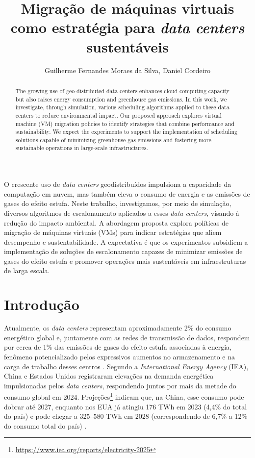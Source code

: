 \documentclass[12pt]{article}
\title{Migração de máquinas virtuais como estratégia para \textit{data centers} sustentáveis}
\author{Guilherme Fernandes Moraes da Silva\inst{1}, Daniel Cordeiro\inst{1}}
\begin{document}
 

\maketitle

\begin{abstract}
The growing use of geo-distributed data centers enhances cloud computing capacity but also raises energy consumption and greenhouse gas emissions. In this work, we investigate, through simulation, various scheduling algorithms applied to these data centers to reduce environmental impact. Our proposed approach explores virtual machine (VM) migration policies to identify strategies that combine performance and sustainability. We expect the experiments to support the implementation of scheduling solutions capable of minimizing greenhouse gas emissions and fostering more sustainable operations in large-scale infrastructures.
\end{abstract}
     
\begin{resumo}
O crescente uso de \textit{data centers} geodistribuídos impulsiona a capacidade da computação em nuvem, mas também eleva o consumo de energia e as emissões de gases do efeito estufa. Neste trabalho, investigamos, por meio de simulação, diversos algoritmos de escalonamento aplicados a esses \textit{data centers}, visando à redução do impacto ambiental. A abordagem proposta explora políticas de migração de máquinas virtuais (VMs) para indicar estratégias que aliem desempenho e sustentabilidade. A expectativa é que os experimentos subsidiem a implementação de soluções de escalonamento capazes de minimizar emissões de gases do efeito estufa e promover operações mais sustentáveis em infraestruturas de larga escala.
\end{resumo}


\section{Introdução}
Atualmente, os \textit{data centers} representam aproximadamente 2\% do consumo energético global e, juntamente com as redes de transmissão de dados, respondem por cerca de 1\% das emissões de gases do efeito estufa associadas à energia, fenômeno potencializado pelos expressivos aumentos no armazenamento e na carga de trabalho desses centros \cite{masanet:20}. Segundo a \textit{International Energy Agency} (IEA), China e Estados Unidos registraram elevações na demanda energética impulsionadas pelos \textit{data centers}, respondendo juntos por mais da metade do consumo global em 2024. Projeções\footnote{\url{https://www.iea.org/reports/electricity-2025}} indicam que, na China, esse consumo pode dobrar até 2027, enquanto nos EUA já atingiu 176 TWh em 2023 (4,4\% do total do país) e pode chegar a 325–580 TWh em 2028 (correspondendo de 6,7\% a 12\% do consumo total do país) \cite{shehabi:24}.
\end{document}
